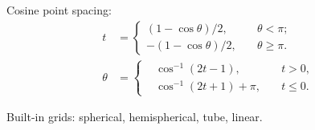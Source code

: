 \documentclass[a4paper,12pt]{article}
\begin{document}
Cosine point spacing:
\begin{subequations}
  \begin{align}
    t &=
    \left\{
      \begin{aligned}
        (1-\cos\theta)/2,  & \quad\theta < \pi;\\
        -(1-\cos\theta)/2, & \quad\theta \geq \pi.
      \end{aligned}
    \right.\\
    \theta &=
    \left\{
    \begin{aligned}
      &\cos^{-1}(2t-1), &\quad t > 0,\\
      &\cos^{-1}(2t+1) + \pi, &\quad t \leq 0.
    \end{aligned}
    \right.
  \end{align}
\end{subequations}

Built-in grids: spherical,  hemispherical, tube, linear. 
\end{document}

